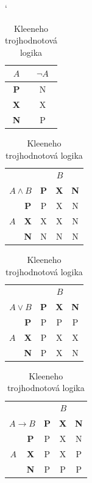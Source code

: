 \documentclass[11pt,a4paper]{article}
\begin{document}
  \begin{table}[ht]
    \catcode`
    \begin{center}
      \begin{tabular}{|c|c|}    \hline
        $A$        & $\neg A$ \\\hline
        \textbf{P} & N        \\\hline
        \textbf{X} & X        \\\hline
        \textbf{N} & P        \\\hline
      \end{tabular}
      \begin{tabular}{|c|c|c|c|c|}\hline
        \multicolumn{2}{|c}{} & \multicolumn{3}{|c|}{$B$}\\\cline{3-5}
        \multicolumn{2}{|c|}{$A \wedge B$} & \textbf{P} & \textbf{X} & \textbf{N} \\\hline
        \multirow{3}{*}{$A$}
          & \textbf{P} & P & X & N \\\cline{2-5}
          & \textbf{X} & X & X & N \\\cline{2-5}
          & \textbf{N} & N & N & N \\\hline
      \end{tabular}
      \begin{tabular}{|c|c|c|c|c|}\hline
        \multicolumn{2}{|c}{} & \multicolumn{3}{|c|}{$B$}\\\cline{3-5}
        \multicolumn{2}{|c|}{$A \vee B$} & \textbf{P} & \textbf{X} & \textbf{N} \\\hline
        \multirow{3}{*}{$A$}
          & \textbf{P} & P & P & P \\\cline{2-5}
          & \textbf{X} & P & X & X \\\cline{2-5}
          & \textbf{N} & P & X & N \\\hline
      \end{tabular}
      \begin{tabular}{|c|c|c|c|c|}\hline
        \multicolumn{2}{|c}{} & \multicolumn{3}{|c|}{$B$}\\\cline{3-5}
        \multicolumn{2}{|c|}{$A \rightarrow B$} & \textbf{P} & \textbf{X} & \textbf{N} \\\hline
        \multirow{3}{*}{$A$}
          & \textbf{P} & P & X & N \\\cline{2-5}
          & \textbf{X} & P & X & P \\\cline{2-5}
          & \textbf{N} & P & P & P \\\hline
      \end{tabular}
      \caption{Kleeneho trojhodnotová logika}
      \label{tab2}
    \end{center}
  \end{table}
\end{document}
